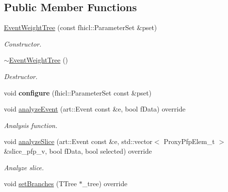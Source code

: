 \subsection*{Public Member Functions}
\begin{DoxyCompactItemize}
\item 
\hyperlink{classanalysis_1_1EventWeightTree_a481af16f4e8721805bbe7fb5f0b1da2a}{Event\-Weight\-Tree} (const fhicl\-::\-Parameter\-Set \&pset)
\begin{DoxyCompactList}\small\item\em Constructor. \end{DoxyCompactList}\item 
\hypertarget{classanalysis_1_1EventWeightTree_ac4c13dc05b4378d910f25afdd410475b}{\hyperlink{classanalysis_1_1EventWeightTree_ac4c13dc05b4378d910f25afdd410475b}{$\sim$\-Event\-Weight\-Tree} ()}\label{classanalysis_1_1EventWeightTree_ac4c13dc05b4378d910f25afdd410475b}

\begin{DoxyCompactList}\small\item\em Destructor. \end{DoxyCompactList}\item 
\hypertarget{classanalysis_1_1EventWeightTree_a1998d34a8451a1e7ec8a6131fc50f97d}{void {\bfseries configure} (fhicl\-::\-Parameter\-Set const \&pset)}\label{classanalysis_1_1EventWeightTree_a1998d34a8451a1e7ec8a6131fc50f97d}

\item 
\hypertarget{classanalysis_1_1EventWeightTree_a1af84126be9ecd2ae71013db4d2c1af7}{void \hyperlink{classanalysis_1_1EventWeightTree_a1af84126be9ecd2ae71013db4d2c1af7}{analyze\-Event} (art\-::\-Event const \&e, bool f\-Data) override}\label{classanalysis_1_1EventWeightTree_a1af84126be9ecd2ae71013db4d2c1af7}

\begin{DoxyCompactList}\small\item\em Analysis function. \end{DoxyCompactList}\item 
\hypertarget{classanalysis_1_1EventWeightTree_a2e30de7f19d6f20e6c3f7ffdb41b22a6}{void \hyperlink{classanalysis_1_1EventWeightTree_a2e30de7f19d6f20e6c3f7ffdb41b22a6}{analyze\-Slice} (art\-::\-Event const \&e, std\-::vector$<$ Proxy\-Pfp\-Elem\-\_\-t $>$ \&slice\-\_\-pfp\-\_\-v, bool f\-Data, bool selected) override}\label{classanalysis_1_1EventWeightTree_a2e30de7f19d6f20e6c3f7ffdb41b22a6}

\begin{DoxyCompactList}\small\item\em Analyze slice. \end{DoxyCompactList}\item 
\hypertarget{classanalysis_1_1EventWeightTree_a7f86ad4b26cab90a5e90a84d57530a26}{void \hyperlink{classanalysis_1_1EventWeightTree_a7f86ad4b26cab90a5e90a84d57530a26}{set\-Branches} (T\-Tree $\ast$\-\_\-tree) override}\label{classanalysis_1_1EventWeightTree_a7f86ad4b26cab90a5e90a84d57530a26}


\end{DoxyCompactItemize}
